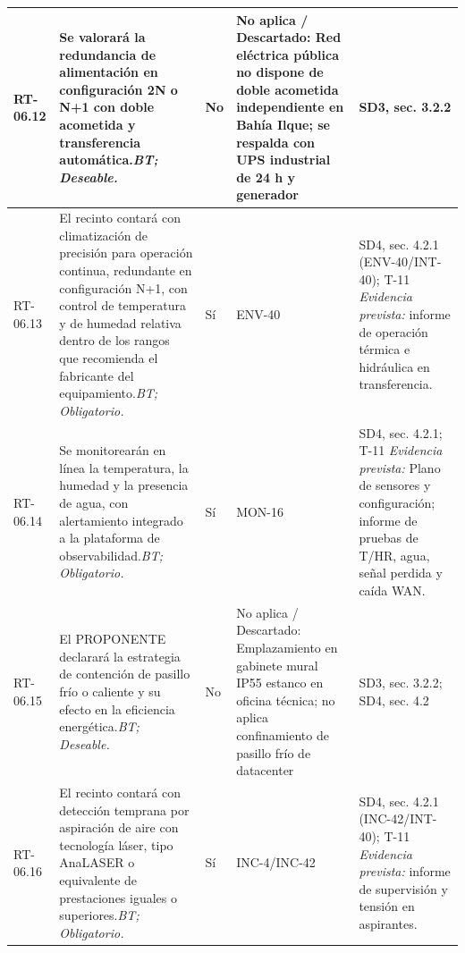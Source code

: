 \begin{paginaHorizontalSynaptix}
\begin{longtable}{|L{0.09\AnchoMatrizTDoce}|L{0.385\AnchoMatrizTDoce}|L{0.065\AnchoMatrizTDoce}|L{0.18\AnchoMatrizTDoce}|L{0.28\AnchoMatrizTDoce}|}
RT-\allowbreak{}06.\allowbreak{}12 &
Se valorará la redundancia de alimentación en configuración 2N o N+1 con doble acometida y transferencia automática.\newline\textit{BT; Deseable.} &
No &
No aplica / Descartado: Red eléctrica pública no dispone de doble acometida independiente en Bahía Ilque; se respalda con UPS industrial de 24 h y generador &
SD3, sec. 3.2.2 \\ \hline

RT-\allowbreak{}06.\allowbreak{}13 &
El recinto contará con climatización de precisión para operación continua, redundante en configuración N+1, con control de temperatura y de humedad relativa dentro de los rangos que recomienda el fabricante del equipamiento.\newline\textit{BT; Obligatorio.} &
Sí &
ENV-40 &
SD4, sec. 4.2.1 (ENV-40/INT-40); T-11 \newline\textit{Evidencia prevista:} informe de operación térmica e hidráulica en transferencia. \\ \hline

RT-\allowbreak{}06.\allowbreak{}14 &
Se monitorearán en línea la temperatura, la humedad y la presencia de agua, con alertamiento integrado a la plataforma de observabilidad.\newline\textit{BT; Obligatorio.} &
Sí &
MON-16 &
SD4, sec. 4.2.1; T-11 \newline\textit{Evidencia prevista:} Plano de sensores y configuración; informe de pruebas de T/HR, agua, señal perdida y caída WAN. \\ \hline

RT-\allowbreak{}06.\allowbreak{}15 &
El PROPONENTE declarará la estrategia de contención de pasillo frío o caliente y su efecto en la eficiencia energética.\newline\textit{BT; Deseable.} &
No &
No aplica / Descartado: Emplazamiento en gabinete mural IP55 estanco en oficina técnica; no aplica confinamiento de pasillo frío de datacenter &
SD3, sec. 3.2.2; SD4, sec. 4.2 \\ \hline

RT-\allowbreak{}06.\allowbreak{}16 &
El recinto contará con detección temprana por aspiración de aire con tecnología láser, tipo AnaLASER o equivalente de prestaciones iguales o superiores.\newline\textit{BT; Obligatorio.} &
Sí &
INC-4/\allowbreak{}INC-42 &
SD4, sec. 4.2.1 (INC-42/INT-40); T-11 \newline\textit{Evidencia prevista:} informe de supervisión y tensión en aspirantes. \\ \hline


\end{longtable}
\end{paginaHorizontalSynaptix}
